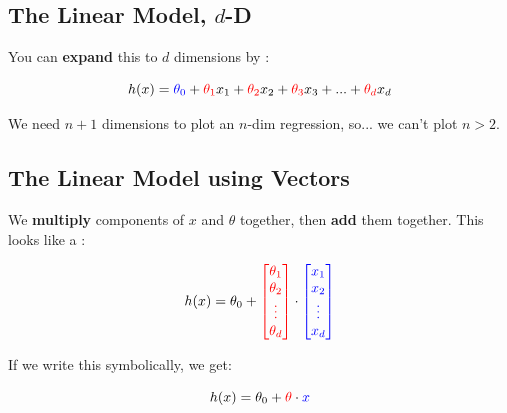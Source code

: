     \subsection{The Linear Model, $d$-D}
    
        You can \textbf{expand} this to $d$ dimensions by :
        
        \begin{equation}
            h(x) = \textcolor{blue}{\theta_0} + \textcolor{red}{\theta_1}x_1 + \textcolor{red}{\theta_2}x_2 + \textcolor{red}{\theta_3}x_3 + ... + \textcolor{red}{\theta_d}x_d
        \end{equation}

        We need $n+1$ dimensions to plot an $n$-dim regression, so... we can't plot $n>2$.

    \phantom{}
        
    \subsection{The Linear Model using Vectors}
        
        We \textbf{multiply} components of $x$ and $\theta$ together, then \textbf{add} them together. This looks like a :
        
        \begin{equation}
            h(x) = \theta_0 +
            \textcolor{red}{
                \begin{bmatrix}
                    \theta_1 \\ \theta_2 \\ \vdots \\ \theta_d
                \end{bmatrix}
                }
                \cdot
                \textcolor{blue}{
                \begin{bmatrix}
                    x_1 \\ x_2 \\ \vdots \\ x_d
                \end{bmatrix}
            }
        \end{equation}
        
        If we write this symbolically, we get:
        
        \begin{equation}
            h(x) = \theta_0 + \textcolor{red}{\theta} \cdot \textcolor{blue}{x} 
        \end{equation}
        

